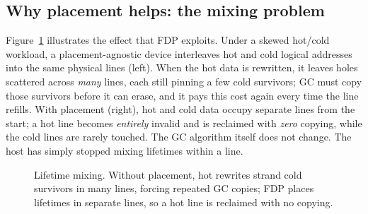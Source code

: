 \documentclass[conference,10pt]{IEEEtran}
\begin{document}
\subsection{Why placement helps: the mixing problem}
Figure~\ref{fig:concept} illustrates the effect that FDP exploits. Under a
skewed hot/cold workload, a placement-agnostic device interleaves hot and cold
logical addresses into the same physical lines (left). When the hot data is
rewritten, it leaves holes scattered across \emph{many} lines, each still
pinning a few cold survivors; GC must copy those survivors before it can erase,
and it pays this cost again every time the line refills. With placement (right),
hot and cold data occupy separate lines from the start; a hot line becomes
\emph{entirely} invalid and is reclaimed with \emph{zero} copying, while the cold
lines are rarely touched. The GC algorithm itself does not change. The host has
simply stopped mixing lifetimes within a line.

\begin{figure}[t]
\centering
{}
\caption{Lifetime mixing. Without placement, hot rewrites strand cold survivors
in many lines, forcing repeated GC copies; FDP places lifetimes in separate
lines, so a hot line is reclaimed with no copying.}
\label{fig:concept}
\end{figure}
\end{document}

